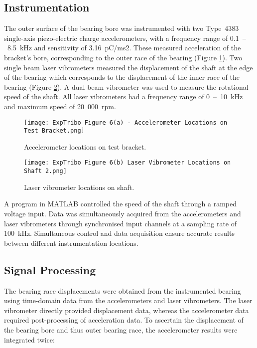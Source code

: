 \subsection{Instrumentation}
The outer surface of the bearing bore was instrumented with two Type~4383 single-axis piezo-electric charge accelerometers, with a frequency range of 0.1~–~8.5~kHz and sensitivity of 3.16~pC/ms2.  These measured acceleration of the bracket’s bore, corresponding to the outer race of the bearing (Figure \ref{Accelerometer locations on test bracket}). Two single beam laser vibrometers measured the displacement of the shaft at the edge of the bearing which corresponds to the displacement of the inner race of the bearing (Figure \ref{Laser vibrometer locations on shaft}). A dual-beam vibrometer was used to measure the rotational speed of the shaft. All laser vibrometers had a frequency range of 0~–~10~kHz and maximum speed of 20~000~rpm.

\begin{figure}
	\centering
	\texttt{[image: ExpTribo Figure 6(a) - Accelerometer Locations on Test Bracket.png]}
	\caption{Accelerometer locations on test bracket.}
	\label{Accelerometer locations on test bracket}
\end{figure}

\begin{figure}
	\centering
	\texttt{[image: ExpTribo Figure 6(b) Laser Vibrometer Locations on Shaft 2.png]}
	\caption{Laser vibrometer locations on shaft.}
	\label{Laser vibrometer locations on shaft}
\end{figure}

A program in MATLAB controlled the speed of the shaft through a ramped voltage input. Data was simultaneously acquired from the accelerometers and laser vibrometers through synchronised input channels at a sampling rate of 100~kHz. Simultaneous control and data acquisition ensure accurate results between different instrumentation locations.

\subsection{Signal Processing}
The bearing race displacements were obtained from the instrumented bearing using time-domain data from the accelerometers and laser vibrometers. The laser vibrometer directly provided displacement data, whereas the accelerometer data required post-processing of acceleration data. To ascertain the displacement of the bearing bore and thus outer bearing race, the accelerometer results were integrated twice:

